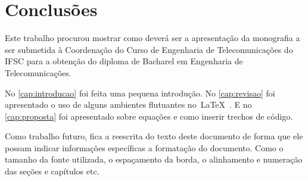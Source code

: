 \chapter{Conclusões}\label{cap:conclusoes}

Este trabalho procurou mostrar como deverá ser a apresentação da monografia a ser submetida à Coordenação do Curso de Engenharia de Telecomunicações do \gls{IFSC} para a obtenção do diploma de Bacharel em Engenharia de Telecomunicações.

No \autoref{cap:introducao} foi feita uma pequena introdução. No \autoref{cap:revisao} foi apresentado o uso de alguns ambientes flutuantes no~\LaTeX~. E no \autoref{cap:proposta} foi apresentado sobre equações e como inserir trechos de código.

Como trabalho futuro, fica a reescrita do texto deste documento de forma que ele possam indicar informações específicas a formatação do documento. Como o tamanho da fonte utilizada, o espaçamento da borda, o alinhamento e numeração das seções e capítulos etc.